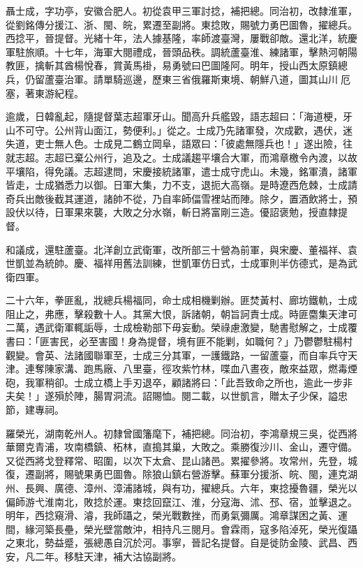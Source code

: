 \begin{pinyinscope}
聶士成，字功亭，安徽合肥人。初從袁甲三軍討捻，補把總。同治初，改隸淮軍，從劉銘傳分援江、浙、閩、皖，累遷至副將。東捻敗，賜號力勇巴圖魯，擢總兵。西捻平，晉提督。光緒十年，法人據基隆，率師渡臺灣，屢戰卻敵。還北洋，統慶軍駐旅順。十七年，海軍大閱禮成，晉頭品秩。調統蘆臺淮、練諸軍，擊熱河朝陽教匪，擒斬其酋楊悅春，賞黃馬褂，易勇號曰巴圖隆阿。明年，授山西太原鎮總兵，仍留蘆臺治軍。請單騎巡邊，歷東三省俄羅斯東境、朝鮮八道，圖其山川厄塞，著東游紀程。

逾歲，日韓亂起，隨提督葉志超軍牙山。聞高升兵艦毀，語志超曰：「海道梗，牙山不可守。公州背山面江，勢便利。」從之。士成乃先諸軍發，次成歡，遇伏，迷失道，吏士無人色。士成見二鶴立岡阜，語眾曰：「彼處無隱兵也！」遂出險，往就志超。志超已棄公州行，追及之。士成議趨平壤合大軍，而鴻章檄令內渡，以故平壤陷，得免議。志超逮問，宋慶接統諸軍，遣士成守虎山。未幾，銘軍潰，諸軍皆走，士成猶悉力以御。日軍大集，力不支，退扼大高嶺。是時遼西危棘，士成請奇兵出敵後截其運道，諸帥不從，乃自率師偪雪裡站而陣。除夕，置酒飲將士，預設伏以待，日軍果來襲，大敗之分水嶺，斬日將富剛三造。優詔褒勉，授直隸提督。

和議成，還駐蘆臺。北洋創立武衛軍，改所部三十營為前軍，與宋慶、董福祥、袁世凱並為統帥。慶、福祥用舊法訓練，世凱軍仿日式，士成軍則半仿德式，是為武衛四軍。

二十六年，拳匪亂，戕總兵楊福同，命士成相機剿辦。匪焚黃村、廊坊鐵軌，士成阻止之，弗應，擊殺數十人。其黨大恨，訴諸朝，朝旨訶責士成。時匪麕集天津可二萬，遇武衛軍輒詬辱，士成檢勒部下毋妄動。榮祿慮激變，馳書慰解之，士成覆書曰：「匪害民，必至害國！身為提督，境有匪不能剿，如職何？」乃鬱鬱駐楊村觀變。會英、法諸國聯軍至，士成三分其軍，一護鐵路，一留蘆臺，而自率兵守天津。連奪陳家溝、跑馬廠、八里臺，徑攻紫竹林，喋血八晝夜，敵來益眾，燃毒煙砲，我軍稍卻。士成立橋上手刃退卒，顧諸將曰：「此吾致命之所也，逾此一步非夫矣！」遂殞於陣，腸胃洞流。詔賜恤。閱二載，以世凱言，贈太子少保，謚忠節，建專祠。

羅榮光，湖南乾州人。初隸曾國籓麾下，補把總。同治初，李鴻章規三吳，從西將華爾克青浦，攻南橋鎮、柘林，直搗其巢，大敗之。乘勝復沙川、金山，遷守備。又從西將戈登釋常、昭圍，以次下太倉、昆山諸邑。累擢參將。攻常州，先登，城復，遷副將，賜號果勇巴圖魯。除狼山鎮右營游擊。蘇軍分援浙、皖、閩，連克湖州、長興、廣德、漳州、漳浦諸城，與有功，擢總兵。六年，東捻擾魯疆，榮光以偏師游弋淮南北，敗捻於運。東捻回竄江、淮，分寇海、沭、邳、宿，並擊退之。明年，西捻窺滑、濬，我師躡之，榮光戰數挫，而勇氣彌厲。鴻章謀困之黃、運間，緣河築長壘，榮光壁當敵沖，相持凡三閱月。會霖雨，寇多陷淖死，榮光復躡之東北，勢益蹙，張總愚自沉於河。事寧，晉記名提督。自是徙防金陵、武昌、西安，凡二年。移駐天津，補大沽協副將。


\end{pinyinscope}
